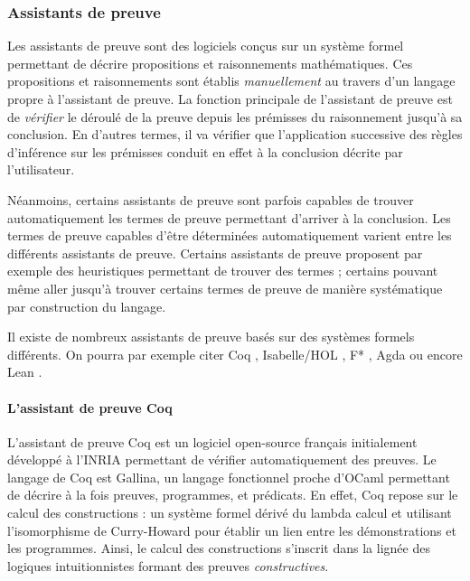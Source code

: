 			\subsubsection{Assistants de preuve}

			Les assistants de preuve sont des logiciels conçus sur un système formel permettant de décrire propositions et raisonnements mathématiques. Ces propositions et raisonnements sont établis \emph{manuellement} au travers d'un langage propre à l'assistant de preuve. La fonction principale de l'assistant de preuve est de \emph{vérifier} le déroulé de la preuve depuis les prémisses du raisonnement jusqu'à sa conclusion. En d'autres termes, il va vérifier que l'application successive des règles d'inférence sur les prémisses conduit en effet à la conclusion décrite par l'utilisateur.

			Néanmoins, certains assistants de preuve sont parfois capables de trouver automatiquement les termes de preuve permettant d'arriver à la conclusion. Les termes de preuve capables d'être déterminées automatiquement varient entre les différents assistants de preuve. Certains assistants de preuve proposent par exemple des heuristiques permettant de trouver des termes ; certains pouvant même aller jusqu'à trouver certains termes de preuve de manière systématique par construction du langage.

			Il existe de nombreux assistants de preuve basés sur des systèmes formels différents. On pourra par exemple citer Coq \cite{coq}, Isabelle/HOL \cite{isabellehol}, F* \cite{fstar}, Agda \cite{agda} ou encore Lean \cite{lean}.

			\paragraph{L'assistant de preuve Coq} L'assistant de preuve Coq \cite{coq} est un logiciel open-source français initialement développé à l'INRIA permettant de vérifier automatiquement des preuves. Le langage de Coq est Gallina, un langage fonctionnel proche d'OCaml permettant de décrire à la fois preuves, programmes, et prédicats. En effet, Coq repose sur le calcul des constructions : un système formel dérivé du lambda calcul et utilisant l'isomorphisme de Curry-Howard \cite{isomorphismhoward, isomorphismcurryfeys, isomorphismcurry} pour établir un lien entre les démonstrations et les programmes. Ainsi, le calcul des constructions s'inscrit dans la lignée des logiques intuitionnistes formant des preuves \emph{constructives}. 

